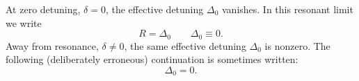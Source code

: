 \documentclass{article}
\begin{document}
At zero detuning, $\delta=0$, the effective detuning $\Delta_0$ vanishes.  In this
resonant limit we write
\begin{equation}
R = \Delta_0 \qquad \Delta_0 \equiv 0 .\label{resonant}
\end{equation}
Away from resonance, $\delta\ne0$, the same effective detuning $\Delta_0$ is nonzero.
The following (deliberately erroneous) continuation is sometimes written:
\begin{equation}
\Delta_0 = 0 .\label{off-resonant}
\end{equation}
\end{document}
